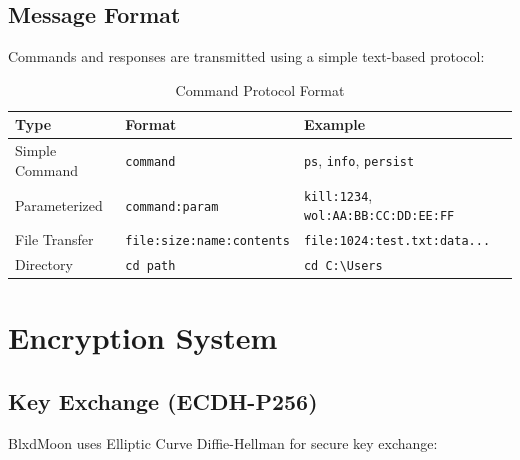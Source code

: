 \documentclass[12pt,a4paper]{article}
\begin{document}
\subsection{Message Format}

Commands and responses are transmitted using a simple text-based protocol:

\begin{table}[H]
\centering
\begin{tabular}{lll}
\toprule
\textbf{Type} & \textbf{Format} & \textbf{Example} \\
\midrule
Simple Command & \texttt{command} & \texttt{ps}, \texttt{info}, \texttt{persist} \\
Parameterized & \texttt{command:param} & \texttt{kill:1234}, \texttt{wol:AA:BB:CC:DD:EE:FF} \\
File Transfer & \texttt{file:size:name:contents} & \texttt{file:1024:test.txt:data...} \\
Directory & \texttt{cd path} & \texttt{cd C:\textbackslash Users} \\
\bottomrule
\end{tabular}
\caption{Command Protocol Format}
\end{table}

\newpage
\section{Encryption System}

\subsection{Key Exchange (ECDH-P256)}

BlxdMoon uses Elliptic Curve Diffie-Hellman for secure key exchange:
\end{document}
